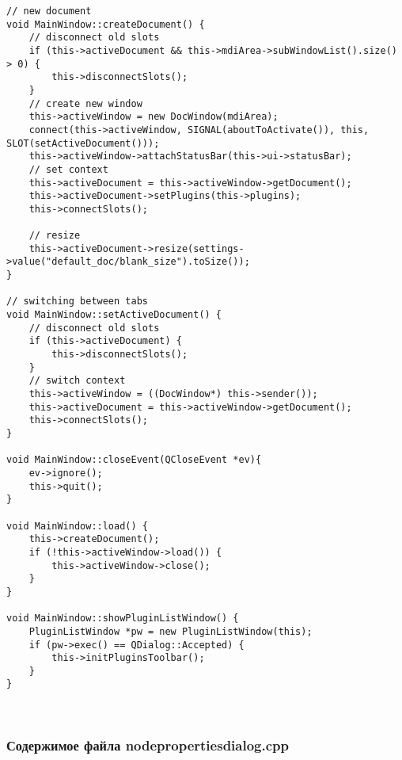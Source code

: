 \begin{lstlisting}
// new document
void MainWindow::createDocument() {
    // disconnect old slots
    if (this->activeDocument && this->mdiArea->subWindowList().size() > 0) {
        this->disconnectSlots();
    }
    // create new window
    this->activeWindow = new DocWindow(mdiArea);
    connect(this->activeWindow, SIGNAL(aboutToActivate()), this, SLOT(setActiveDocument()));
    this->activeWindow->attachStatusBar(this->ui->statusBar);
    // set context
    this->activeDocument = this->activeWindow->getDocument();
    this->activeDocument->setPlugins(this->plugins);
    this->connectSlots();

    // resize
    this->activeDocument->resize(settings->value("default_doc/blank_size").toSize());
}

// switching between tabs
void MainWindow::setActiveDocument() {
    // disconnect old slots
    if (this->activeDocument) {
        this->disconnectSlots();
    }
    // switch context
    this->activeWindow = ((DocWindow*) this->sender());
    this->activeDocument = this->activeWindow->getDocument();
    this->connectSlots();
}

void MainWindow::closeEvent(QCloseEvent *ev){
    ev->ignore();
    this->quit();
}

void MainWindow::load() {
    this->createDocument();
    if (!this->activeWindow->load()) {
        this->activeWindow->close();
    }
}

void MainWindow::showPluginListWindow() {
    PluginListWindow *pw = new PluginListWindow(this);
    if (pw->exec() == QDialog::Accepted) {
        this->initPluginsToolbar();
    }
}

\end{lstlisting}~\\

\subsubsection*{Содержимое файла nodepropertiesdialog.cpp}

